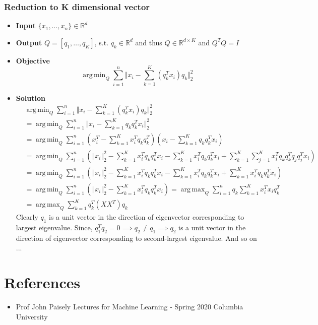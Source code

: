 \documentclass{article}
\DeclareMathOperator*{\argmax}{arg\,max}
\DeclareMathOperator*{\argmin}{arg\,min}
\newcommand{\hrfullline}{\noindent\makebox[\linewidth]{\rule{\paperwidth}{2pt}}}
\begin{document}
\subsubsection{Reduction to K dimensional vector}
\begin{itemize}
    \item \textbf{Input} $\{x_1, \dots, x_n\} \in \mathbb{R}^d$
    \item \textbf{Output} $Q=[q_1, \dots, q_K]$, s.t. $q_k \in \mathbb{R}^d$ and thus $Q \in \mathbb{R}^{d \times K}$ and $Q^TQ=I$
    \item \textbf{Objective} 
        $$\argmin_{Q} \sum_{i=1}^n \Vert x_i - \sum_{k=1}^K(q_k^Tx_i)q_k \Vert_2^2  $$
    \item \textbf{Solution} 
        \begin{align*}
            & \argmin_{Q} \sum_{i=1}^n \Vert x_i - \sum_{k=1}^K(q_k^Tx_i)q_k \Vert_2^2\\
            &= \argmin_{Q} \sum_{i=1}^n \Vert x_i - \sum_{k=1}^K q_kq_k^Tx_i \Vert_2^2 \\
            &= \argmin_{Q} \sum_{i=1}^n (x_i^T - \sum_{k=1}^K x_i^Tq_kq_k^T)(x_i - \sum_{k=1}^K q_kq_k^Tx_i) \\
            &= \argmin_{Q} \sum_{i=1}^n \left( \Vert x_i \Vert_2^2 - \sum_{k=1}^K x_i^Tq_kq_k^Tx_i - \sum_{k=1}^K x_i^Tq_kq_k^Tx_i + \sum_{k=1}^K\sum_{j=1}^K x_i^Tq_kq_k^Tq_jq_j^Tx_i \right)\\
            &= \argmin_{Q} \sum_{i=1}^n \left( \Vert x_i \Vert_2^2 - \sum_{k=1}^K x_i^Tq_kq_k^Tx_i - \sum_{k=1}^K x_i^Tq_kq_k^Tx_i + \sum_{k=1}^K x_i^Tq_kq_k^Tx_i \right)\\
            &= \argmin_{Q} \sum_{i=1}^n \left( \Vert x_i \Vert_2^2 - \sum_{k=1}^K x_i^Tq_kq_k^Tx_i \right)
            = \argmax_{Q} \sum_{i=1}^n q_k\sum_{k=1}^K x_i^Tx_iq_k^T \\
            &= \argmax_{Q} \sum_{k=1}^K q_k^T( XX^T )q_k
        \end{align*}
        Clearly $q_1$ is a unit vector in the direction of eigenvector corresponding to largest eigenvalue. Since, $q_1^Tq_2=0 \implies q_2\neq q_1 \implies q_2$ is a unit vector in the direction of eigenvector corresponding to second-largest eigenvalue.  And so on ...
\end{itemize}

\hrfullline

\section{References}
\begin{itemize}
    \item Prof John Paisely Lectures for Machine Learning - Spring 2020 Columbia University
\end{itemize}
\end{document}
